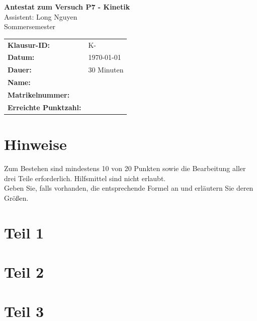 \documentclass[a4paper,10pt]{article}
\newcommand{\klausurID}{K-\randomid}
\begin{document}
\pagestyle{fancy}
\fancyhead[R]{\textbf{\klausurID}}


\begin{center}
  {\LARGE\bfseries Antestat zum Versuch P7 - Kinetik}\\[1ex]
  {\large Assistent: Long Nguyen}\\[1ex]
    {\large Sommersemester \the \year}
\end{center}

\begin{examheaderbox}
\begin{tabular}{p{5cm}p{8cm}}
\textbf{Klausur-ID:} & \klausurID \\
\textbf{Datum:} & \today \\
\textbf{Dauer:} & 30 Minuten \\[1.5ex]
\textbf{Name:} & \hrulefill \\[1.5ex]
\textbf{Matrikelnummer:} & \hrulefill \\[1.5ex]
\textbf{Erreichte Punktzahl:} & \hrulefill \\
\end{tabular}
\end{examheaderbox}

\section*{Hinweise}
Zum Bestehen sind mindestens 10 von 20 Punkten sowie die Bearbeitung aller drei Teile erforderlich. Hilfsmittel sind nicht erlaubt.\\
Geben Sie, falls vorhanden, die entsprechende Formel an und erläutern Sie deren Größen.





\section*{Teil 1}
\section*{Teil 2}
\section*{Teil 3}


\newpage
\printsolutions[Punkt=0.5]
\printsolutions[Punkt=1]
\end{document}
